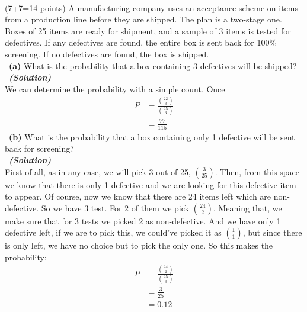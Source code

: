 \documentclass[a4 paper]{article}
\numberwithin{equation}{section}
\newcommand{\problem}[2]{~\\\fbox{\textbf{Problem #1}}\hfill (#2 points)\newline\newline}
\newcommand{\subproblem}[1]{~\newline\textbf{(#1)}}
\newcommand{\solution}{~\newline\textbf{\textit{(Solution)}} }
\newcommand{\0}{\mathbf{0}}
\begin{document}
\problem{5:}{7+7=14}
A manufacturing company uses an acceptance scheme on items from a production line before they
are shipped. The plan is a two-stage one. Boxes of 25 items are ready for shipment, and a sample of 3 items is tested for defectives. If any defectives are found, the entire box is sent back for 100\% screening. If no defectives are found, the box is shipped.\\
\subproblem{a} What is the probability that a box containing 3 defectives will be shipped?\\
\solution \\
We can determine the probability with a simple count. Once 
\begin{align*}
    P &= \frac{\binom{22}{3}}{\binom{25}{3}} \\
    &= \frac{77}{115}
\end{align*}{}
\newline
\subproblem{b} What is the probability that a box containing only 1 defective will be sent back for screening?\\
\solution \\
First of all, as in any case, we will pick 3 out of 25, $\binom{3}{25}$. Then, from this space we know that there is only 1 defective and we are looking for this defective item to appear. Of course, now we know that there are 24 items left which are non-defective. So we have 3 test. For 2 of them we pick $\binom{24}{2}$. Meaning that, we make sure that for 3 tests we picked 2 as non-defective. And we have only 1 defective left, if we are to pick this, we could've picked it as $\binom{1}{1}$, but since there is only left, we have no choice but to pick the only one. So this makes the probability:
\begin{align*}
    P &= \frac{\binom{24}{2}}{\binom{25}{3}} \\
    &= \frac{3}{25} \\
    &= 0.12
\end{align*}{}
\end{document}
